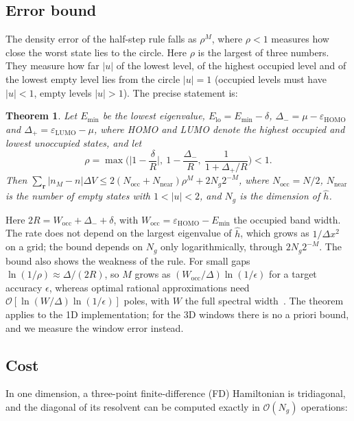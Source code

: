 \documentclass[aps,prb,twocolumn,superscriptaddress,floatfix,longbibliography]{revtex4-2}
\newtheorem{theorem}{Theorem}
\theoremstyle{remark}
\begin{document}
\subsection{Error bound}

The density error of the half-step rule falls as $\rho^M$, where $\rho<1$ measures how close the worst state lies to the
circle. Here $\rho$ is the largest of three numbers. They measure how far $|u|$ of the lowest level, of the highest occupied level
and of the lowest empty level lies from the circle $|u|=1$ (occupied levels must have $|u|<1$, empty levels $|u|>1$). The
precise statement is:

\begin{theorem}\label{thm:conv}
Let $E_\mathrm{min}$ be the lowest eigenvalue, $E_\mathrm{lo}=E_\mathrm{min}-\delta$, $\Delta_-=\mu-\varepsilon_\mathrm{HOMO}$ and
$\Delta_+=\varepsilon_\mathrm{LUMO}-\mu$, where HOMO and LUMO denote the highest occupied and lowest unoccupied states, and let
\begin{equation}
\rho=\max\Big(\Big|1-\frac{\delta}{R}\Big|,\ 1-\frac{\Delta_-}{R},\ \frac{1}{1+\Delta_+/R}\Big)<1 .
\end{equation}
Then $\sum_{\bm r}|n_M-n|\Delta V\le2(N_\mathrm{occ}+N_\mathrm{near})\rho^M+2N_g2^{-M}$, where $N_\mathrm{occ}=N/2$,
$N_\mathrm{near}$ is the number of empty states with $1<|u|<2$, and $N_g$ is the dimension of $\hat h$.
\end{theorem}

Here $2R=W_\mathrm{occ}+\Delta_-+\delta$, with $W_\mathrm{occ}=\varepsilon_\mathrm{HOMO}-E_\mathrm{min}$ the occupied band
width. The rate does not depend on the largest eigenvalue of $\hat h$, which grows as $1/\Delta x^2$ on a grid; the bound
depends on $N_g$ only logarithmically, through $2N_g2^{-M}$. The bound also shows the weakness of the rule. For small gaps
$\ln(1/\rho)\approx\Delta/(2R)$, so $M$ grows as $(W_\mathrm{occ}/\Delta)\ln(1/\epsilon)$ for a target accuracy $\epsilon$,
whereas optimal rational approximations need $\mathcal O[\ln(W/\Delta)\ln(1/\epsilon)]$ poles, with $W$ the full spectral
width~\cite{LinLuYingE2009,Moussa2016,Guettel2015}. The theorem applies to the 1D implementation; for the 3D windows
there is no a priori bound, and we measure the window error instead.

\subsection{Cost}

In one dimension, a three-point finite-difference (FD) Hamiltonian is tridiagonal, and the diagonal of its resolvent can
be computed exactly in $\mathcal O(N_g)$ operations:
\end{document}
